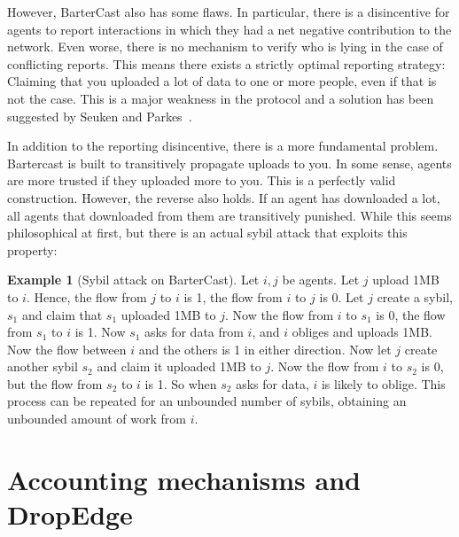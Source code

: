 \documentclass[a4paper,11pt]{book}
\theoremstyle{definition}
\newtheorem*{example}{Example}
\begin{document}
However, BarterCast also has some flaws. In particular, there is a disincentive for agents to report
interactions in which they had a net negative contribution to the network. Even worse, there is no mechanism
to verify who is lying in the case of conflicting reports. This means there exists a strictly optimal 
reporting strategy: Claiming that you uploaded a lot of data to one or more people, even if that is not
the case. This is a major weakness in the protocol and a solution has been suggested by Seuken and 
Parkes~\cite{seuken2010accounting}. 

In addition to the reporting disincentive, there is a more fundamental problem. Bartercast is built
to transitively propagate uploads to you. In some sense, agents are more trusted if they uploaded
more to you. This is a perfectly valid construction. However, the reverse also holds. If an agent
has downloaded a lot, all agents that downloaded from them are transitively punished. While
this seems philosophical at first, but there is an actual sybil
attack that exploits this property:

\begin{example}[Sybil attack on BarterCast]
     Let $i, j$ be agents. Let $j$ upload 1MB to $i$. Hence, the flow from $j$ to $i$ is 1, the flow
    from $i$ to $j$ is 0. Let $j$ create a sybil, $s_1$ and claim that $s_1$ uploaded 1MB to $j$.
    Now the flow from $i$ to $s_1$ is $0$, the flow from $s_1$ to $i$ is 1. Now $s_1$ asks
    for data from $i$, and $i$ obliges and uploads 1MB. Now the flow between $i$ and the others is
    1 in either direction. Now let $j$ create another sybil $s_2$ and claim it uploaded 1MB to $j$. 
    Now the flow from $i$ to $s_2$ is 0, but the flow from $s_2$ to $i$ is 1. 
    So when $s_2$ asks for data, $i$ is likely to oblige. This process can be repeated for an unbounded
    number of sybils, obtaining an unbounded amount of work from $i$.
\end{example}

\section{Accounting mechanisms and DropEdge}
\end{document}
